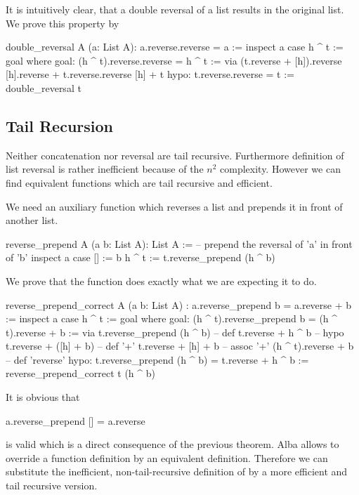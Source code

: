 It is intuitively clear, that a double reversal of a list results in the
original list. We prove this property by
%
\begin{alba}
  double_reversal A (a: List A): a.reverse.reverse = a :=
    inspect a case
      h ^ t :=
        goal where
          goal: (h ^ t).reverse.reverse = h ^ t :=
            via
              (t.reverse + [h]).reverse
              [h].reverse + t.reverse.reverse
              [h] + t
          hypo: t.reverse.reverse = t :=
            double_reversal t
\end{alba}



\subsection{Tail Recursion}

Neither concatenation nor reversal are tail recursive. Furthermore definition
of list reversal is rather inefficient because of the $n^2$
complexity. However we can find equivalent functions which are tail recursive
and efficient.

We need an auxiliary function which reverses a list and prepends it in front
of another list.

\begin{alba}
  reverse_prepend A (a b: List A): List A :=
      -- prepend the reversal of 'a' in front of 'b'
    inspect
      a
    case
      [] :=
        b
      h ^ t :=
        t.reverse_prepend (h ^ b)
\end{alba}


We prove that the function does exactly what we are expecting it to do.

\begin{alba}
  reverse_prepend_correct
    A (a b: List A)
    : a.reverse_prepend b = a.reverse + b :=
      inspect a case
        h ^ t :=
          goal where
            goal: (h ^ t).reverse_prepend  b = (h ^ t).reverse + b :=
              via
                t.reverse_prepend (h ^ b)            -- def
                t.reverse + h ^ b                    -- hypo
                t.reverse + ([h] + b)                -- def '+'
                t.reverse + [h] + b                  -- assoc '+'
                (h ^ t).reverse + b                  -- def 'reverse'
             hypo: t.reverse_prepend (h ^ b) = t.reverse + h ^ b :=
               reverse_prepend_correct t (h ^ b)
\end{alba}


It is obvious that
%
\begin{alba}
  a.reverse_prepend [] = a.reverse
\end{alba}
%
is valid which is a direct consequence of the previous theorem. Alba allows to
override a function definition by an equivalent definition. Therefore we can
substitute the inefficient, non-tail-recursive definition of  by
a more efficient and tail recursive version.

